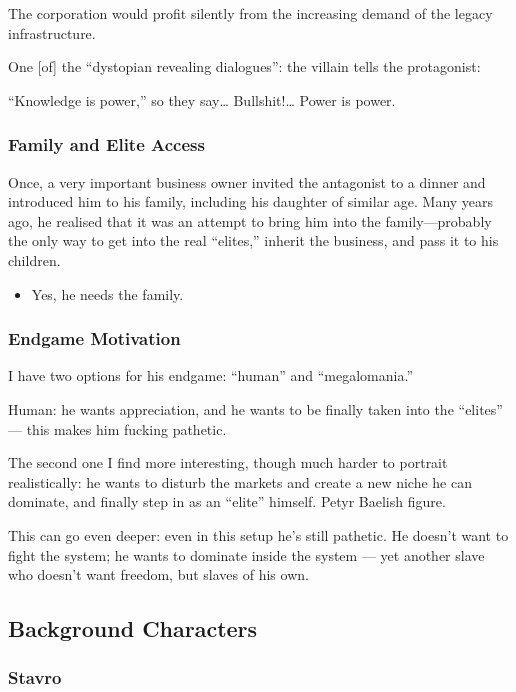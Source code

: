 \documentclass[12pt]{article}
\begin{document}
The corporation would profit silently from the increasing demand of the legacy infrastructure.

One [of] the “dystopian revealing dialogues”: the villain tells the protagonist:

“Knowledge is power,” so they say… Bullshit!… Power is power.

\subsubsection{Family and Elite Access}

Once, a very important business owner invited the antagonist to a dinner and introduced him to his family, including his daughter of similar age. Many years ago, he realised that it was an attempt to bring him into the family—probably the only way to get into the real “elites,” inherit the business, and pass it to his children.

\begin{itemize}
  \item Yes, he needs the family.
\end{itemize}

\subsubsection{Endgame Motivation}

I have two options for his endgame: “human” and “megalomania.”

Human: he wants appreciation, and he wants to be finally taken into the “elites” — this makes him fucking pathetic.

The second one I find more interesting, though much harder to portrait realistically: he wants to disturb the markets and create a new niche he can dominate, and finally step in as an “elite” himself. Petyr Baelish figure.

This can go even deeper: even in this setup he’s still pathetic. He doesn’t want to fight the system; he wants to dominate inside the system — yet another slave who doesn’t want freedom, but slaves of his own.

\subsection{Background Characters}

\subsubsection*{Stavro}
\end{document}
